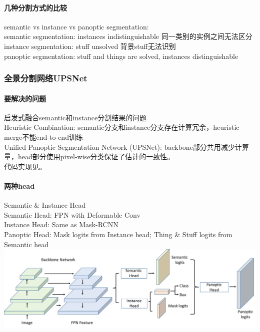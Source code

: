 \documentclass[UTF8, a4paper]{ctexart}
\begin{document}
\paragraph{几种分割方式的比较}
semantic vs instance vs panoptic segmentation: \\
semantic segmentation: instances indistinguishable 同一类别的实例之间无法区分\\
instance segmentation: stuff unsolved 背景stuff无法识别\\
panoptic segmentation: stuff and things are solved, instances distinguishable

\subsubsection{全景分割网络UPSNet\cite{UPSNet}}

\paragraph{要解决的问题}
启发式融合semantic和instance分割结果的问题\\
Heuristic Combination:
semantic分支和instance分支存在计算冗余，heuristic merge不能end-to-end训练\\
Unified Panoptic Segmentation Network (UPSNet):
backbone部分共用减少计算量，head部分使用pixel-wise分类保证了估计的一致性。\\
代码实现见\cite{upsnet_code}。

\paragraph{两种head}
Semantic $\&$ Instance Head\\
Semantic Head: FPN with Deformable Conv\\
Instance Head: Same as Mask-RCNN\\
Panoptic Head: Mask logits from Instance head; Thing $\&$ Stuff logits from Semantic head\\

{\includegraphics[width=0.95\linewidth]{UPSNet-network}}
\end{document}
